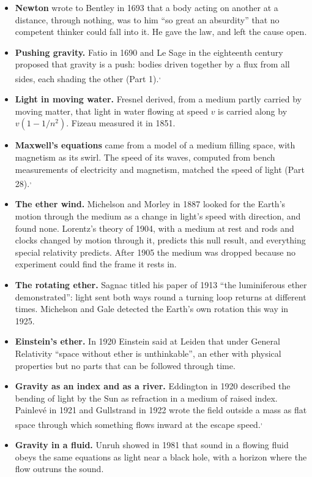 \documentclass[11pt,a4paper]{article}
\begin{document}
\begin{itemize}
\item \textbf{Newton} wrote to Bentley in 1693 that a body acting on another at a distance, through nothing, was to him ``so great an absurdity'' that no competent thinker could fall into it. He gave the law, and left the cause open.
\item \textbf{Pushing gravity.} Fatio in 1690 and Le Sage in the eighteenth century proposed that gravity is a push: bodies driven together by a flux from all sides, each shading the other (Part 1).\textsuperscript{,}
\item \textbf{Light in moving water.} Fresnel derived, from a medium partly carried by moving matter, that light in water flowing at speed $v$ is carried along by $v(1-1/n^2)$. Fizeau measured it in 1851.
\item \textbf{Maxwell's equations} came from a model of a medium filling space, with magnetism as its swirl. The speed of its waves, computed from bench measurements of electricity and magnetism, matched the speed of light (Part 28).\textsuperscript{,}
\item \textbf{The ether wind.} Michelson and Morley in 1887 looked for the Earth's motion through the medium as a change in light's speed with direction, and found none. Lorentz's theory of 1904, with a medium at rest and rods and clocks changed by motion through it, predicts this null result, and everything special relativity predicts. After 1905 the medium was dropped because no experiment could find the frame it rests in.
\item \textbf{The rotating ether.} Sagnac titled his paper of 1913 ``the luminiferous ether demonstrated'': light sent both ways round a turning loop returns at different times. Michelson and Gale detected the Earth's own rotation this way in 1925.
\item \textbf{Einstein's ether.} In 1920 Einstein said at Leiden that under General Relativity ``space without ether is unthinkable'', an ether with physical properties but no parts that can be followed through time.
\item \textbf{Gravity as an index and as a river.} Eddington in 1920 described the bending of light by the Sun as refraction in a medium of raised index. Painlevé in 1921 and Gullstrand in 1922 wrote the field outside a mass as flat space through which something flows inward at the escape speed.\textsuperscript{,}
\item \textbf{Gravity in a fluid.} Unruh showed in 1981 that sound in a flowing fluid obeys the same equations as light near a black hole, with a horizon where the flow outruns the sound.
\end{itemize}
\end{document}
